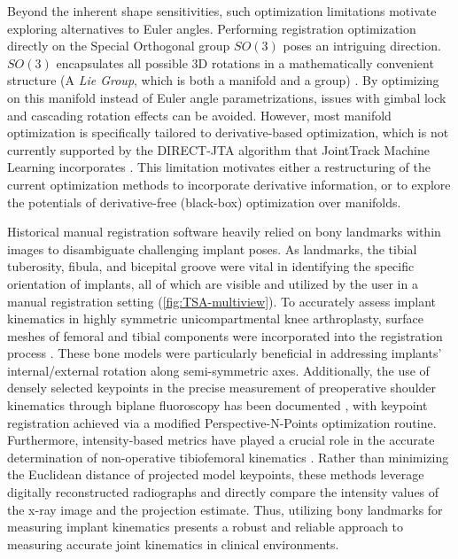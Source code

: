 Beyond the inherent shape sensitivities, such optimization limitations motivate exploring alternatives to Euler angles.
Performing registration optimization directly on the Special Orthogonal group $SO(3)$ poses an intriguing direction.
$SO(3)$ encapsulates all possible 3D rotations in a mathematically convenient structure (A \emph{Lie Group}, which is both a manifold and a group) \cite{zillerLieGroupsRepresentation2010,serreLieAlgebrasLie1992}.
By optimizing on this manifold instead of Euler angle parametrizations, issues with gimbal lock and cascading rotation effects can be avoided.
However, most manifold optimization is specifically tailored to derivative-based optimization, which is not currently supported by the DIRECT-JTA algorithm that JointTrack Machine Learning incorporates \cite{jensenJointTrackMachine2023,jonesLipschitzianOptimizationLipschitz1993,floodAutomatedRegistration3D2018}.
This limitation motivates either a restructuring of the current optimization methods to incorporate derivative information, or to explore the potentials of derivative-free (black-box) optimization \cite{audetDerivativeFreeBlackboxOptimization2017} over manifolds.


Historical manual registration software heavily relied on bony landmarks within images to disambiguate challenging implant poses.
As landmarks, the tibial tuberosity, fibula, and bicepital groove were vital in identifying the specific orientation of implants, all of which are visible and utilized by the user in a manual registration setting (\cref{fig:TSA-multiview}).
To accurately assess implant kinematics in highly symmetric unicompartmental knee arthroplasty, surface meshes of femoral and tibial components were incorporated into the registration process \cite{banksComparingVivoKinematics2005}.
These bone models were particularly beneficial in addressing implants' internal/external rotation along semi-symmetric axes.
Additionally, the use of densely selected keypoints in the precise measurement of preoperative shoulder kinematics through biplane fluoroscopy has been documented \cite{burtonFullyAutomaticTracking2023}, with keypoint registration achieved via a modified Perspective-N-Points optimization routine.
Furthermore, intensity-based metrics have played a crucial role in the accurate determination of non-operative tibiofemoral kinematics \cite{bakaStatisticalShapeModelBased2012}.
Rather than minimizing the Euclidean distance of projected model keypoints, these methods leverage digitally reconstructed radiographs and directly compare the intensity values of the x-ray image and the projection estimate.
Thus, utilizing bony landmarks for measuring implant kinematics presents a robust and reliable approach to measuring accurate joint kinematics in clinical environments.



